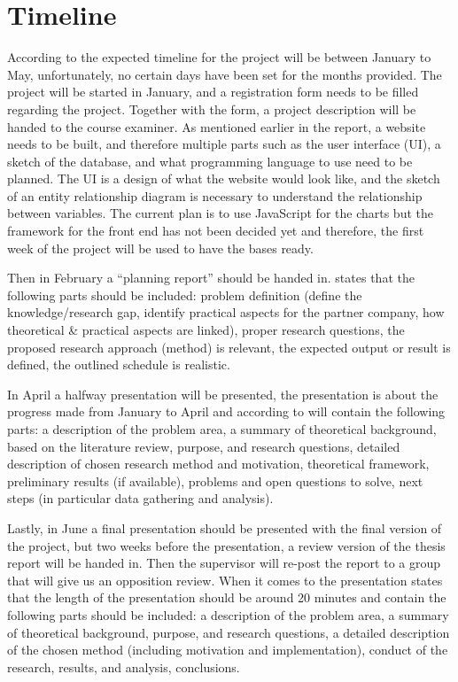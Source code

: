 \section{Timeline}
According to \cite{juCourse} the expected timeline for the project will be between January to May, unfortunately, no certain days have been set for the months provided. The project will be started in January, and a registration form needs to be filled regarding the project. Together with the form, a project description will be handed to the course examiner. As mentioned earlier in the report, a website needs to be built, and therefore multiple parts such as the user interface (UI), a sketch of the database, and what programming language to use need to be planned. The UI is a design of what the website would look like, and the sketch of an entity relationship diagram is necessary to understand the relationship between variables. The current plan is to use JavaScript for the charts but the framework for the front end has not been decided yet and therefore, the first week of the project will be used to have the bases ready.   

Then in February a “planning report” should be handed in. \cite{juCourse} states that the following parts should be included: problem definition (define the knowledge/research gap, identify practical aspects for the partner company, how theoretical \& practical aspects are linked), proper research questions, the proposed research approach (method) is relevant, the expected output or result is defined, the outlined schedule is realistic.


In April a halfway presentation will be presented, the presentation is about the progress made from January to April and according to \cite{juCourse} will contain the following parts: a description of the problem area, a summary of theoretical background, based on the literature review, purpose, and research questions, detailed description of chosen research method and motivation, theoretical framework, preliminary results (if available), problems and open questions to solve, next steps (in particular data gathering and analysis).




Lastly, in June a final presentation should be presented with the final version of the project, but two weeks before the presentation, a review version of the thesis report will be handed in. Then the supervisor will re-post the report to a group that will give us an opposition review.  When it comes to the presentation \cite{juCourse} states that the length of the presentation should be around 20 minutes and contain the following parts should be included: a description of the problem area, a summary of theoretical background, purpose, and research questions, a detailed description of the chosen method (including motivation and implementation), conduct of the research, results, and analysis, conclusions.
